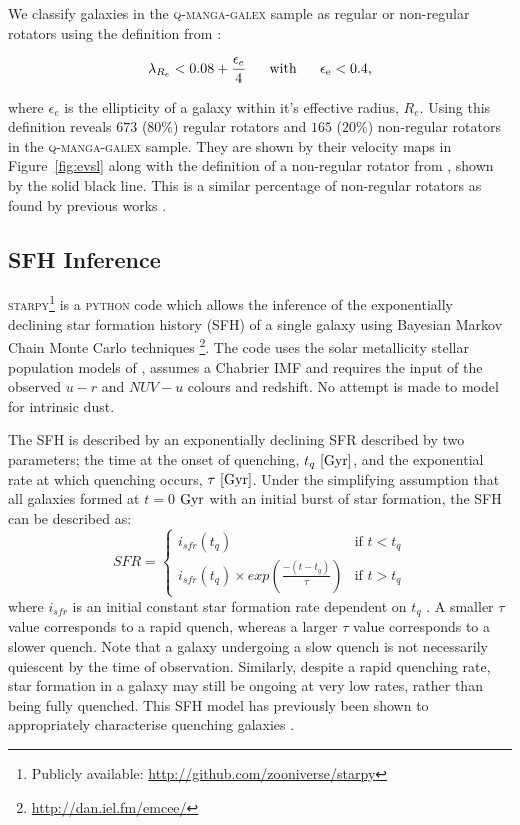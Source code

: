 \documentclass[useAMS,usenatbib]{mn2e}
\begin{document}
We classify galaxies in the \textsc{q-manga-galex} sample as regular or non-regular rotators using the definition from \cite{cappellari16}:

\begin{equation}
\lambda_{R_{e}} < 0.08 + \frac{\epsilon_e}{4} ~~~~~ \rm{with} ~~~~~ \epsilon_e < 0.4,
\end{equation}

where $\epsilon_e$ is the ellipticity of a galaxy within it's effective radius, $R_e$. Using this definition reveals $673$ ($80\%$) regular rotators and $165$ ($20\%$) non-regular rotators in the \textsc{q-manga-galex} sample. They are shown by their velocity maps in Figure~\ref{fig:evsl} along with the definition of a non-regular rotator from \cite{cappellari16}, shown by the solid black line. This is a similar percentage of non-regular rotators as found by previous works \citep[$14-17\%$ of early-types; ][]{emsellem11, stott16}.

\subsection{SFH Inference}\label{sec:starpy}

\textsc{starpy}\footnote{Publicly available: \url{http://github.com/zooniverse/starpy}} is a \textsc{python} code which allows the inference of the exponentially declining star formation history (SFH) of a single galaxy using  Bayesian Markov Chain Monte Carlo techniques \citep{emcee13}\footnote{\url{http://dan.iel.fm/emcee/}}. The code uses the solar metallicity stellar population models of \cite[][hereafter BC03]{BC03}, assumes a Chabrier IMF \citep{chabrier03} and requires the input of the observed $u-r$ and $NUV-u$ colours and redshift. No attempt is made to model for intrinsic dust. 

The SFH is described by an exponentially declining SFR described by two parameters; the time at the onset of quenching, $t_q~\rm{[Gyr]}$, and the exponential rate at which quenching occurs, $\tau~\rm{[Gyr]}$. Under the simplifying assumption that all galaxies formed at $t=0$ $\rm{ Gyr}$ with an initial burst of star formation, the SFH can be described as: 
\begin{equation}\label{sfh}
SFR =
\begin{cases}
i_{sfr}(t_q) & \text{if } t < t_q \\
i_{sfr}(t_q) \times exp{\left( \frac{-(t-t_{q})}{\tau}\right)} & \text{if } t > t_q 
\end{cases}
\end{equation}
where $i_{sfr}$ is an initial constant star formation rate dependent on $t_q$ \citep{schawinski14, smethurst15}.  A smaller $\tau$ value corresponds to a rapid quench, whereas a larger $\tau$ value corresponds to a slower quench. Note that a galaxy undergoing a slow quench is not necessarily quiescent by the time of observation. Similarly, despite a rapid quenching rate, star formation in a galaxy may still be ongoing at very low rates, rather than being fully quenched. This SFH model has previously been shown to appropriately characterise quenching galaxies \citep{Weiner06, Martin07, Noeske07,schawinski14}. 
\end{document}
